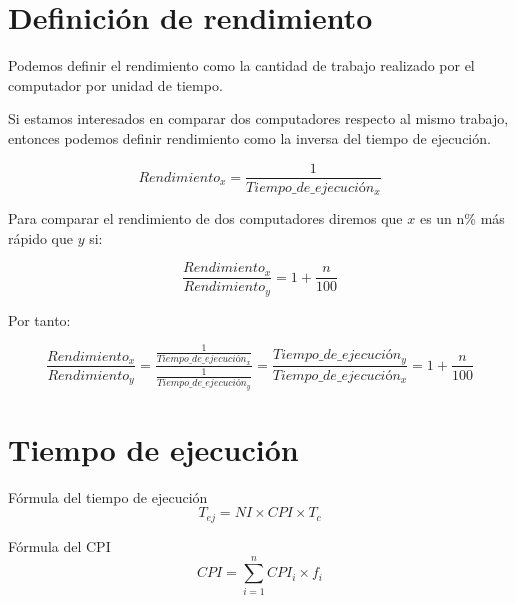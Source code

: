 \documentclass[12pt,onecolumn]{memoir}
\begin{document}
\section{Definición de rendimiento}

Podemos definir el rendimiento como la cantidad de trabajo realizado
por el computador por unidad de tiempo.

Si estamos interesados en comparar dos computadores respecto al mismo
trabajo, entonces podemos definir rendimiento como la inversa del
tiempo de ejecución.

\[ Rendimiento_{x} = \frac{1}{Tiempo\_de\_ejecución_{x}} \]

Para comparar el rendimiento de dos computadores diremos que $x$ es un
n\% más rápido que $y$ si:


\[ \frac{Rendimiento_{x}}{Rendimiento_{y}} = 1 + \frac{n}{100} \]

Por tanto:

\[ \frac{Rendimiento_{x}}{Rendimiento_{y}} =
\frac{\frac{1}{Tiempo\_de\_ejecución_{x}}}{\frac{1}{Tiempo\_de\_ejecución_{y}}}
= \frac{Tiempo\_de\_ejecución_{y}}{Tiempo\_de\_ejecución_{x}} = 1 + \frac{n}{100}\]


\section{Tiempo de ejecución}

Fórmula del tiempo de ejecución \[ T_{ej} = NI \times CPI \times
T_{c} \]

Fórmula del CPI \[ CPI = \sum_{i=1}^{n} CPI_i \times f_i \]
\end{document}
